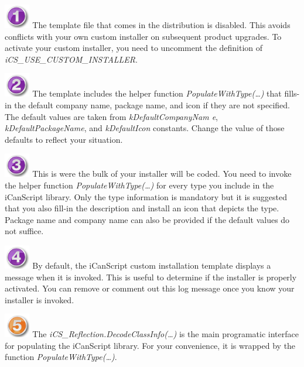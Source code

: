 \includegraphics[width=32pt,height=30pt]{stamp-1-purple.png} The template file that comes in the distribution is disabled. This avoids conflicts with your own custom installer on subsequent product upgrades. To activate your custom installer, you need to uncomment the definition of \emph{\emph{iCS\_USE\_CUSTOM\_INSTALLER}}.

\includegraphics[width=32pt,height=30pt]{stamp-2-purple.png} The template includes the helper function \emph{PopulateWithType(…)} that fills-in the default company name, package name, and icon if they are not specified. The default values are taken from \emph{kDefaultCompanyNam
e}, \emph{kDefaultPackageName}, and \emph{kDefaultIcon} constants. Change the value of those defaults to reflect your situation.

\includegraphics[width=32pt,height=30pt]{stamp-3-purple.png} This is were the bulk of your installer will be coded. You need to invoke the helper function \emph{PopulateWithType(…)} for every type you include in the iCanScript library. Only the type information is mandatory but it is suggested that you also fill-in the description and install an icon that depicts the type. Package name and company name can also be provided if the default values do not suffice.

\includegraphics[width=32pt,height=30pt]{stamp-4-purple.png} By default, the iCanScript custom installation template displays a message when it is invoked. This is useful to determine if the installer is properly activated. You can remove or comment out this log message once you know your installer is invoked.

\includegraphics[width=32pt,height=30pt]{stamp-5-orange.png} The \emph{iCS\_Reflection.DecodeClassInfo(…)} is the main programatic interface for populating the iCanScript library. For your convenience, it is wrapped by the function \emph{PopulateWithType(…)}.

